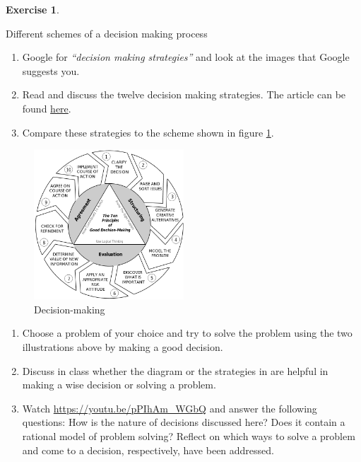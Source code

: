 \documentclass[
  12pt,
  oneside]{book}
\theoremstyle{definition}
\theoremstyle{definition}
\theoremstyle{definition}
\newtheorem{exercise}{Exercise}[chapter]
\theoremstyle{definition}
\theoremstyle{remark}
\begin{document}
\begin{exercise}
\protect\hypertarget{exr:decisionstrategy}{}\label{exr:decisionstrategy}

Different schemes of a decision making process

\begin{enumerate}
\def\labelenumi{\alph{enumi})}
\item
  Google for \emph{``decision making strategies''} and look at the images that Google suggests you.
\item
  Read \citet{IET202312} and discuss the twelve decision making strategies. The article can be found \href{https://www.indeed.com/career-advice/career-development/decision-making-strategies?utm_campaign=earnedsocial\%3Acareerguide\%3Asharedirectshare\%3AUS\&utm_content=12\%20Decision-Making\%20Strategies\&utm_medium=social\&utm_source=directshare}{here}.
\item
  Compare these strategies to the scheme shown in figure \ref{fig:decision}.
\end{enumerate}

\begin{figure}
\centering
\includegraphics[width=0.5\textwidth,height=\textheight]{fig/tenprincipals_png.png}
\caption[\label{fig:decision} Decision-making]{\label{fig:decision} Decision-making\footnotemark{}}
\end{figure}

\begin{enumerate}
\def\labelenumi{\alph{enumi})}
\setcounter{enumi}{3}
\item
  Choose a problem of your choice and try to solve the problem using the two illustrations above by making a good decision.
\item
  Discuss in class whether the diagram or the strategies in \citet{IET202312} are helpful in making a wise decision or solving a problem.
\item
  Watch \url{https://youtu.be/pPIhAm_WGbQ} and answer the following questions: How is the nature of decisions discussed here? Does it contain a rational model of problem solving? Reflect on which ways to solve a problem and come to a decision, respectively, have been addressed.
\end{enumerate}

\end{exercise}
\end{document}
